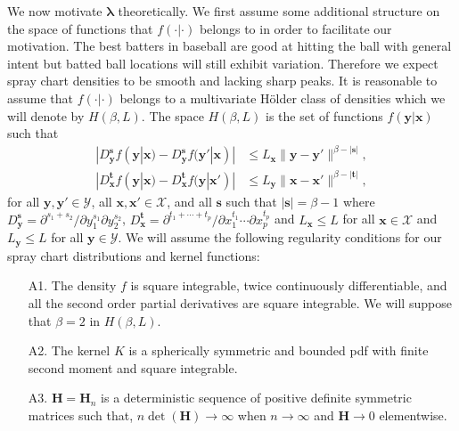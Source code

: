 \documentclass[12pt]{article}
\newcommand{\Y}{\mathcal{Y}}
\newcommand{\X}{\mathcal{X}}
\newcommand{\Hbf}{\textbf{H}}
\newcommand{\y}{\textbf{y}}
\newcommand{\x}{\textbf{x}}
\newcommand{\s}{\textbf{s}}
\newcommand{\tbf}{\textbf{t}}
\newcommand{\lambdabf}{\boldsymbol{\lambda}}
\begin{document}
We now motivate $\lambdabf$ theoretically. We first assume some additional structure on the space of functions that $f(\cdot|\cdot)$ belongs to in order to facilitate our motivation. The best batters in baseball are good at hitting the ball with general intent but batted ball locations will still exhibit variation. Therefore we expect spray chart densities to be smooth and lacking sharp peaks. It is reasonable to assume that $f(\cdot|\cdot)$ belongs to a multivariate H{\"o}lder class of densities which we will denote by $H(\beta,L)$. The space $H(\beta,L)$ is the set of functions $f(\y|\x)$ such that
\begin{align*}
|D_{\y}^\s f(\y|\x) - D_{\y}^\s f(\y'|\x)| &\leq L_\x\|\y - \y'\|^{\beta - |\s|}, \\
|D_{\x}^\tbf f(\y|\x) - D_{\x}^\tbf f(\y|\x')| &\leq L_\y\|\x - \x'\|^{\beta - |\tbf|},
\end{align*}
for all $\y,\y' \in \Y$, all $\x,\x' \in \X$, and all $\s$ such that $|\s| = \beta - 1$ where
$D_{\y}^\s = \partial^{s_1 + s_2}/\partial y_1^{s_1} \partial y_2^{s_2}$,
$D_{\x}^\tbf = \partial^{t_1 + \cdots + t_p}/\partial x_1^{t_1} \cdots \partial x_p^{t_p}$ and $L_\x \leq L$ for all $\x \in \X$ and $L_\y \leq L$ for all $\y \in \Y$.
We will assume the following regularity conditions for our spray chart distributions and kernel functions:

\begin{itemize}
\item[A1.] The density $f$ is square integrable, twice continuously differentiable, and all the second order partial derivatives are square integrable. We will suppose that $\beta = 2$ in $H(\beta,L)$.
\item[A2.] The kernel $K$ is a spherically symmetric and bounded pdf with finite second moment and square integrable.
\item[A3.] $\Hbf = \Hbf_n$ is a deterministic sequence of positive definite symmetric matrices such that, $n\det(\Hbf) \to \infty$ when $n \to \infty$ and $\Hbf \to 0$ elementwise.
\end{itemize}
\end{document}
